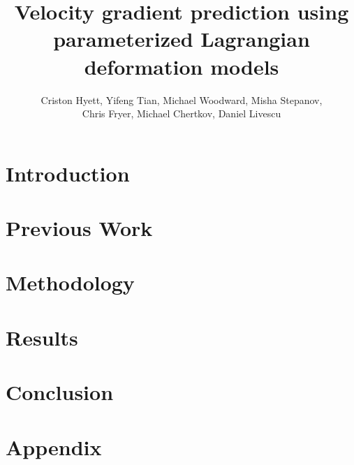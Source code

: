 \documentclass[12pt]{article}
\title{Velocity gradient prediction using parameterized Lagrangian deformation models}
\author{Criston Hyett, Yifeng Tian, Michael Woodward, Misha Stepanov,\\ Chris Fryer, Michael Chertkov, Daniel Livescu}
\newcommand{\<}{\langle}
\renewcommand{\>}{\rangle}
\begin{document}
\maketitle
\abstract{

}

\section{Introduction}


\section{Previous Work}


\section{Methodology}


\section{Results}


\section{Conclusion}


\section{Appendix}


\nocite{*}


\end{document}
